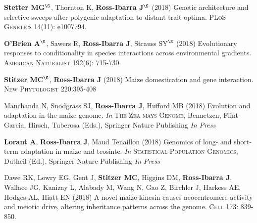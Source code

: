 \begin{etaremune}
\item \textbf{Stetter MG}$^\S$, Thornton K, \textbf{Ross-Ibarra J}$^\S$ (2018) Genetic architecture and selective sweeps after polygenic adaptation to distant trait optima. \textsc{PLoS Genetics} 14(11): e1007794. %

\item \textbf{O'Brien A}$^\S$, Sawers R, \textbf{Ross-Ibarra J}, Strauss  SY$^\S$ (2018) Evolutionary responses to conditionality in species interactions across environmental gradients. \textsc{American Naturalist} 192(6): 715-730.

\item \textbf{Stitzer MC}$^\S$, \textbf{Ross-Ibarra J} (2018) Maize domestication and gene interaction. \textsc{New Phytologist} 220:395-408

\item Manchanda N, Snodgrass SJ, \textbf{Ross-Ibarra J}, Hufford MB (2018) Evolution and adaptation in the maize genome. \textit{In} \textsc{The Zea mays Genome}, Bennetzen, Flint-Garcia, Hirsch, Tuberosa (Eds.), Springer Nature Publishing \textit{In Press}

\item \textbf{Lorant A}, \textbf{Ross-Ibarra J}, Maud Tenaillon (2018) Genomics of long- and short- term adaptation in maize and teosinte. \textit{In} \textsc{Statistical Population Genomics},  Dutheil (Ed.), Springer Nature Publishing \textit{In Press}

\item Dawe RK, Lowry EG, Gent J, \textbf{Stitzer MC}, Higgins DM, \textbf{Ross-Ibarra J}, Wallace JG, Kanizay L, Alabady M, Wang N, Gao Z, Birchler J, Harkess AE, Hodges AL, Hiatt EN (2018) A novel maize kinesin causes neocentromere activity and meiotic drive, altering inheritance patterns across the genome. \textsc{Cell} 173: 839-850.


\end{etaremune}

